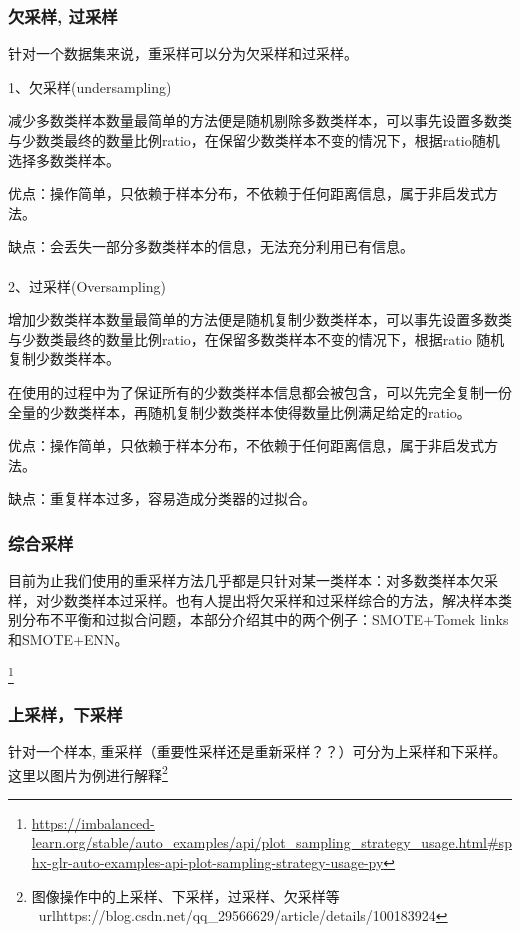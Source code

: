 \subsubsection{欠采样, 过采样}

针对一个数据集来说，重采样可以分为欠采样和过采样。

1、欠采样(undersampling)

减少多数类样本数量最简单的方法便是随机剔除多数类样本，可以事先设置多数类与少数类最终的数量比例ratio，在保留少数类样本不变的情况下，根据ratio随机选择多数类样本。

优点：操作简单，只依赖于样本分布，不依赖于任何距离信息，属于非启发式方法。

缺点：会丢失一部分多数类样本的信息，无法充分利用已有信息。\\ \\

2、过采样(Oversampling)

增加少数类样本数量最简单的方法便是随机复制少数类样本，可以事先设置多数类与少数类最终的数量比例ratio，在保留多数类样本不变的情况下，根据ratio 随机复制少数类样本。

在使用的过程中为了保证所有的少数类样本信息都会被包含，可以先完全复制一份全量的少数类样本，再随机复制少数类样本使得数量比例满足给定的ratio。

优点：操作简单，只依赖于样本分布，不依赖于任何距离信息，属于非启发式方法。

缺点：重复样本过多，容易造成分类器的过拟合。

\subsubsection{综合采样}

目前为止我们使用的重采样方法几乎都是只针对某一类样本：对多数类样本欠采样，对少数类样本过采样。也有人提出将欠采样和过采样综合的方法，解决样本类别分布不平衡和过拟合问题，本部分介绍其中的两个例子：SMOTE+Tomek links和SMOTE+ENN。

\footnote{\url{https://imbalanced-learn.org/stable/auto_examples/api/plot_sampling_strategy_usage.html#sphx-glr-auto-examples-api-plot-sampling-strategy-usage-py}}

\subsubsection{上采样，下采样}

针对一个样本, 重采样（重要性采样还是重新采样？？）可分为上采样和下采样。这里以图片为例进行解释\footnote{图像操作中的上采样、下采样，过采样、欠采样等 \quad \ url{https://blog.csdn.net/qq_29566629/article/details/100183924}}

